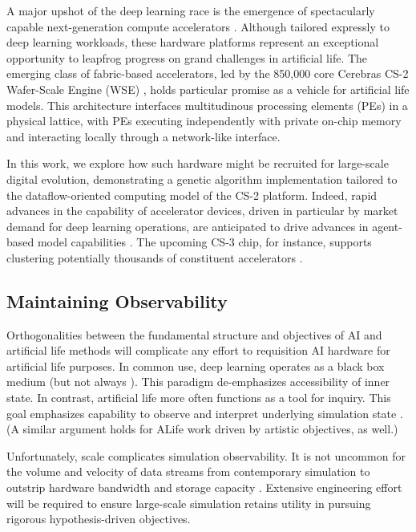 A major upshot of the deep learning race is the emergence of spectacularly capable next-generation compute accelerators \citep{zhang2016cambricon,emani2021accelerating,jia2019dissecting,medina2020habana}.
Although tailored expressly to deep learning workloads, these hardware platforms represent an exceptional opportunity to leapfrog progress on grand challenges in artificial life.
The emerging class of fabric-based accelerators, led by the 850,000 core Cerebras CS-2 Wafer-Scale Engine (WSE) \citep{lauterbach2021path,lie2022cerebras}, holds particular promise as a vehicle for artificial life models.
This architecture interfaces multitudinous processing elements (PEs) in a physical lattice, with PEs executing independently with private on-chip memory and interacting locally through a network-like interface.

In this work, we explore how such hardware might be recruited for large-scale digital evolution, demonstrating a genetic algorithm implementation tailored to the dataflow-oriented computing model of the CS-2 platform.
Indeed, rapid advances in the capability of accelerator devices, driven in particular by market demand for deep learning operations, are anticipated to drive advances in agent-based model capabilities \citep{perumalla2022computer}.
The upcoming CS-3 chip, for instance, supports clustering potentially thousands of constituent accelerators \citep{moore2024cerebras}.


\subsection{Maintaining Observability}

Orthogonalities between the fundamental structure and objectives of AI and artificial life methods will complicate any effort to requisition AI hardware for artificial life purposes.
In common use, deep learning operates as a black box medium \citep{loyola2019black} (but not always \citep{mahendran2015understanding}).
This paradigm de-emphasizes accessibility of inner state.
In contrast, artificial life more often functions as a tool for inquiry.
This goal emphasizes capability to observe and interpret underlying simulation state \citep{moreno2023toward,horgan1995complexity}.
(A similar argument holds for ALife work driven by artistic objectives, as well.)

Unfortunately, scale complicates simulation observability.
It is not uncommon for the volume and velocity of data streams from contemporary simulation to outstrip hardware bandwidth and storage capacity \citep{osti_1770192}.
Extensive engineering effort will be required to ensure large-scale simulation retains utility in pursuing rigorous hypothesis-driven objectives.

